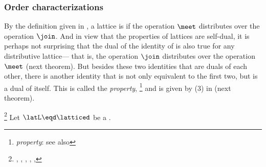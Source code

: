 \subsubsection{Order characterizations}
By the definition given in ,
a lattice is  if the  operation $\meet$ distributes
over the  operation $\join$.
And in view that the properties of lattices are self-dual, it is perhaps not
surprising that the dual of the identity of  is also true
for any distributive lattice---
that is, the  operation $\join$ distributes over
the  operation $\meet$ (next theorem).
But besides these two identities that are duals of each other,
there is another identity that is not only equivalent to the first two,
but is a dual of itself.
This is called the  \emph{property},%
\footnote{%
   \emph{property}: see also 
  }
and is given by (3) in  (next theorem).
\begin{theorem}
\footnote{
  ,
  ,
  ,
  ,
  ,
  }
\label{thm:lat_dis}
Let $\latL\eqd\latticed$ be a  .
\end{theorem}
